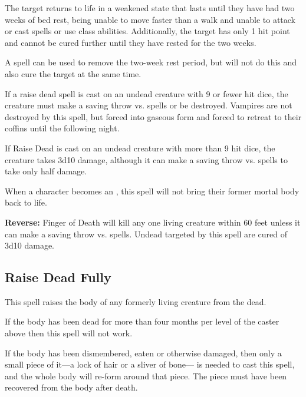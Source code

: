 \begin{multicols*}{2}
The target returns to life in a weakened state that lasts until they have had two weeks of bed rest, being unable to move faster than a walk and unable to attack or cast spells or use class abilities. Additionally, the target has only 1 hit point and cannot be cured further until they have rested for the two weeks.

A  spell can be used to remove the two-week rest period, but will not do this and also cure the target at the same time.

If a raise dead spell is cast on an undead creature with 9 or fewer hit dice, the creature must make a saving throw vs. spells or be destroyed. Vampires are not destroyed by this spell, but forced into gaseous form and forced to retreat to their coffins until the following night.

If Raise Dead is cast on an undead creature with more than 9 hit dice, the creature takes 3d10 damage, although it can make a saving throw vs. spells to take only half damage.

When a character becomes an , this spell will not bring their former mortal body back to life.

\textbf{Reverse:} \hypertarget{spell:Finger of Death}{Finger of Death} will kill any one living creature within 60 feet unless it can make a saving throw vs. spells. Undead targeted by this spell are cured of 3d10 damage.

\subsection{Raise Dead Fully}\label{spell:Raise Dead Fully}

This spell raises the body of any formerly living creature from the dead.

If the body has been dead for more than four months per level of the caster above  then this spell will not work.

If the body has been dismembered, eaten or otherwise damaged, then only a small piece of it—a lock of hair or a sliver of bone— is needed to cast this spell, and the whole body will re-form around that piece. The piece must have been recovered from the body after death.


\end{multicols*}
